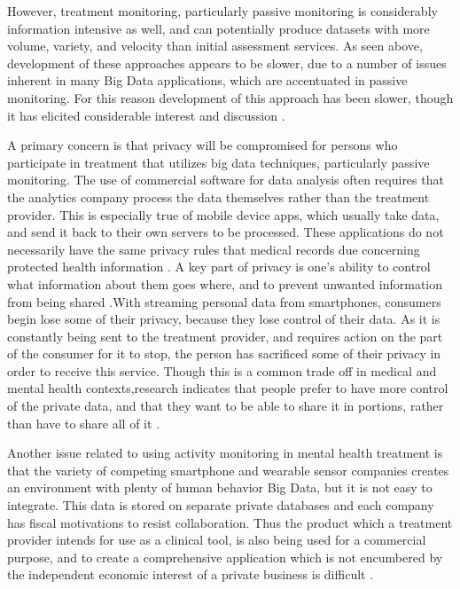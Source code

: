 \documentclass[sigconf]{acmart}
\begin{document}
However, treatment monitoring, particularly passive monitoring is considerably information intensive as well, and can potentially produce datasets with more volume, variety, and velocity than initial assessment services. As seen above, development of these approaches appears to be slower, due to a number of issues inherent in many Big Data applications, which are accentuated in passive monitoring. For this reason development of this approach has been slower, though it has elicited considerable interest and discussion \cite{bitreview}.

A primary concern is that privacy will be compromised for persons who participate in treatment that utilizes big data techniques, particularly passive monitoring. The use of commercial software for data analysis often requires that the analytics company process the data themselves rather than the treatment provider. This is especially true of mobile device apps, which usually take data, and send it back to their own servers to be processed. These applications do not necessarily have the same privacy rules that medical records due concerning protected health information \cite{bigdatabipolar}. A key part of privacy is one's ability to control what information about them goes where, and to prevent unwanted information from being shared \cite{privacy}.With streaming personal data from smartphones, consumers begin lose some of their privacy, because they lose control of their data. As it is constantly being sent to the treatment provider, and requires action on the part of the consumer for it to stop, the person has sacrificed some of their privacy in order to receive this service. Though this is a common trade off in medical and mental health contexts,research indicates that people prefer to have more control of the private data, and that they want to be able to share it in portions, rather than have to share all of it \cite{privacypreference}.

Another issue related to using activity monitoring in mental health treatment is that the variety of competing smartphone and wearable sensor companies creates an environment with plenty of human behavior Big Data, but it is not easy to integrate. This  data is stored on separate private databases and each company has fiscal motivations to resist collaboration. Thus the product which a treatment provider intends for use as a clinical tool, is also being used for a commercial purpose, and to create a comprehensive application which is not encumbered by the independent economic interest of a private business is difficult \cite{openinfrastructure}.
\end{document}
